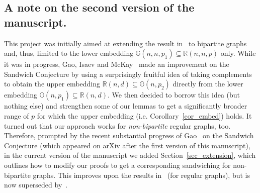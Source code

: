 \documentclass[12pt,reqno]{amsart}
\newcommand{\R} {\mathbb R}
\newcommand{\G} {\mathbb G}
\theoremstyle{definition}
\begin{document}
\subsection{A note on the second version of the manuscript.}
\label{non}
This project was initially aimed at extending the result in~\cite{DFRSc} to bipartite graphs and, thus,  limited to the lower embedding $\G(n,n,p_1) \subseteq \R(n,n,p)$ only. While it was in progress, Gao, Isaev and McKay~\cite{GIM} made an improvement on the Sandwich Conjecture by using a surprisingly fruitful idea of taking complements to obtain the upper embedding $\R(n,d) \subseteq \G(n,p_2)$ directly from the lower embedding $\G(n,p_1) \subseteq \R(n,d)$. We then decided to borrow this idea (but nothing else) and strengthen some of our lemmas to get a significantly broader range of $p$ for which the upper embedding (i.e. Corollary~\ref{cor_embed}) holds. It turned out that our approach works for \emph{non-bipartite} regular graphs, too. Therefore, prompted by the recent substantial progress of Gao~\cite{G20} on the Sandwich Conjecture (which appeared on arXiv after the first version of this manuscript), in the current version of the manuscript we added Section~\ref{sec_extension}, which outlines how to modify our proofs to get a corresponding sandwiching for non-bipartite graphs. This improves upon the results in~\cite{GIM} (for regular graphs), but is now superseded by~\cite{G20}.
\end{document}
